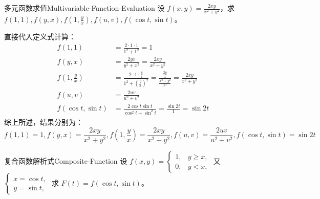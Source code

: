 \begin{problem}{多元函数求值}{Multivariable-Function-Evaluation}
    设 $f(x, y) = \frac{2xy}{x^2+y^2}$，求 $f(1, 1), f(y, x), f(1, \frac{y}{x}), f(u, v), f(\cos t, \sin t)$。
\end{problem}

\begin{solution}
    直接代入定义式计算：
    \begin{equation}
        \begin{aligned}
            f(1, 1)                        & = \frac{2 \cdot 1 \cdot 1}{1^2 + 1^2} = 1                                                                                                     \\
            f(y, x)                        & = \frac{2yx}{y^2 + x^2} = \frac{2xy}{x^2 + y^2}                                                                                               \\
            f\left( 1, \frac{y}{x} \right) & = \frac{2 \cdot 1 \cdot \frac{y}{x}}{1^2 + \left( \frac{y}{x} \right)^2} = \frac{\frac{2y}{x}}{\frac{x^2 + y^2}{x^2}} = \frac{2xy}{x^2 + y^2} \\
            f(u, v)                        & = \frac{2uv}{u^2 + v^2}                                                                                                                       \\
            f(\cos t, \sin t)              & = \frac{2\cos t \sin t}{\cos^2 t + \sin^2 t} = \frac{\sin 2t}{1} = \sin 2t
        \end{aligned}
    \end{equation}
    综上所述，结果分别为：
    \begin{equation}
        \boxed{f(1, 1) = 1, f(y, x) = \frac{2xy}{x^2+y^2}, f\left( 1, \frac{y}{x} \right) = \frac{2xy}{x^2+y^2}, f(u, v) = \frac{2uv}{u^2+v^2}, f(\cos t, \sin t) = \sin 2t}
    \end{equation}
\end{solution}

\begin{problem}{复合函数解析式}{Composite-Function}
    设 $f(x, y) = \begin{cases} 1, & y \geqslant x, \\ 0, & y < x, \end{cases}$ 又 $\begin{cases} x = \cos t, \\ y = \sin t, \end{cases}$ 求 $F(t) = f(\cos t, \sin t)$。
\end{problem}

